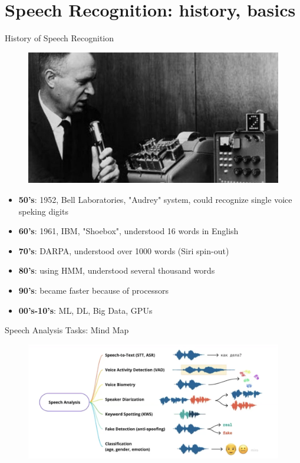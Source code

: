 
\section{Speech Recognition: history, basics}
\begin{frame}{History of Speech Recognition}
	\begin{figure}
		\centering
		\includegraphics[width=0.7\linewidth]{figs/audrey.png}
	\end{figure}
	\begin{itemize}
		\item \textbf{50's}: 1952, Bell Laboratories, "Audrey" system, could recognize single voice speking digits
		\item \textbf{60's}: 1961, IBM, "Shoebox", understood 16 words in English
		\item \textbf{70's}: DARPA, understood over 1000 words (Siri spin-out)
		\item \textbf{80's}: using HMM, understood several thousand words
		\item \textbf{90's}: became faster because of processors
		\item \textbf{00's-10's}: ML, DL, Big Data, GPUs
	\end{itemize}
\end{frame}
\begin{frame}{Speech Analysis Tasks: Mind Map}
	\begin{figure}
		\centering
		\includegraphics[width=0.99\linewidth]{figs/tasks_2.png}
	\end{figure}
\end{frame}
